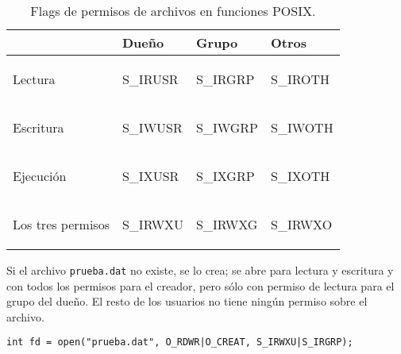 \begin{table}
\centering
\begin{tabular}{l|l|l|l}
	& Dueño & Grupo & Otros \\
\hline
Lectura & 
\begin{codecell}
S_IRUSR
\end{codecell}
& 
\begin{codecell}
S_IRGRP
\end{codecell}
 & 
\begin{codecell}
S_IROTH
\end{codecell}
 \\
Escritura & 
\begin{codecell}
S_IWUSR
\end{codecell}
& 
\begin{codecell}
S_IWGRP
\end{codecell}
 & 
\begin{codecell}
S_IWOTH
\end{codecell}
 \\
Ejecución & 
\begin{codecell}
S_IXUSR
\end{codecell}
 & 
\begin{codecell}
S_IXGRP
\end{codecell}
 & 
\begin{codecell}
S_IXOTH
\end{codecell}
 \\
Los tres permisos & 
\begin{codecell}
S_IRWXU
\end{codecell}
 & 
\begin{codecell}
S_IRWXG 
\end{codecell}
& 
\begin{codecell}
S_IRWXO
\end{codecell}
\\
\end{tabular}
 \caption{Flags de permisos de archivos en funciones POSIX.}
 \label{tab:permisos} 
 \end{table} 



\begin{ejemplo}
Si el archivo \lstinline{prueba.dat} no existe, se lo crea; se abre para lectura y
escritura y con todos los permisos para el creador, pero sólo con permiso de
lectura para el grupo del dueño. El resto de los usuarios no tiene ningún
permiso sobre el archivo.
\begin{lstlisting}
int fd = open("prueba.dat", O_RDWR|O_CREAT, S_IRWXU|S_IRGRP);	
\end{lstlisting}
\end{ejemplo}


